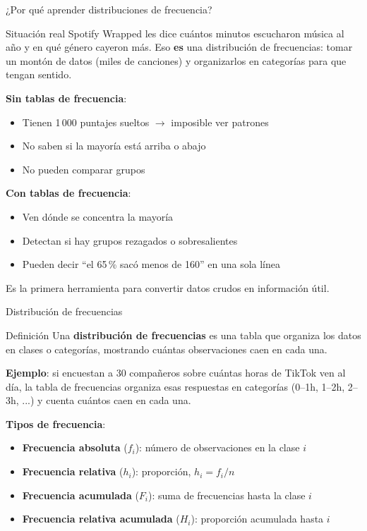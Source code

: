 \documentclass[aspectratio=169, 11pt]{beamer}
\begin{document}
\begin{frame}{¿Por qué aprender distribuciones de frecuencia?}
\begin{exampleblock}{Situación real}
Spotify Wrapped les dice cu\'antos minutos escucharon m\'usica al a\~no y en qu\'e g\'enero cayeron m\'as.
Eso \textbf{es} una distribuci\'on de frecuencias: tomar un mont\'on de datos (miles de canciones) y organizarlos en categor\'ias para que tengan sentido.
\end{exampleblock}

\textbf{Sin tablas de frecuencia}:
\begin{itemize}
\item Tienen 1\,000 puntajes sueltos $\to$ imposible ver patrones
\item No saben si la mayor\'ia est\'a arriba o abajo
\item No pueden comparar grupos
\end{itemize}

\textbf{Con tablas de frecuencia}:
\begin{itemize}
\item Ven d\'onde se concentra la mayor\'ia
\item Detectan si hay grupos rezagados o sobresalientes
\item Pueden decir ``el 65\,\% sac\'o menos de 160'' en una sola l\'inea
\end{itemize}

\vspace{0.3em}
\alert{Es la primera herramienta para convertir datos crudos en informaci\'on \'util.}
\end{frame}

\begin{frame}{Distribución de frecuencias}
\begin{block}{Definición}
Una \textbf{distribución de frecuencias} es una tabla que organiza los datos en clases o categor\'ias, mostrando cu\'antas observaciones caen en cada una.
\end{block}

\textbf{Ejemplo}: si encuestan a 30 compa\~neros sobre cu\'antas horas de TikTok ven al d\'ia, la tabla de frecuencias organiza esas respuestas en categor\'ias (0--1h, 1--2h, 2--3h, ...) y cuenta cu\'antos caen en cada una.

\textbf{Tipos de frecuencia}:
\begin{itemize}
\item \textbf{Frecuencia absoluta} ($f_i$): número de observaciones en la clase $i$
\item \textbf{Frecuencia relativa} ($h_i$): proporción, $h_i = f_i / n$
\item \textbf{Frecuencia acumulada} ($F_i$): suma de frecuencias hasta la clase $i$
\item \textbf{Frecuencia relativa acumulada} ($H_i$): proporción acumulada hasta $i$
\end{itemize}
\end{frame}
\end{document}
